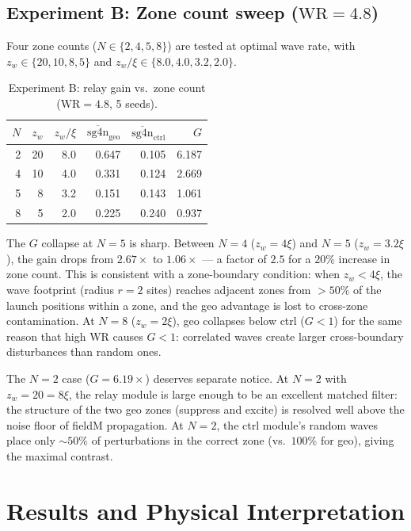 \documentclass[11pt]{article}
\begin{document}
\subsection*{Experiment B: Zone count sweep ($\mathrm{WR} = 4.8$)}

Four zone counts ($N \in \{2, 4, 5, 8\}$) are tested at optimal wave rate,
with $z_w \in \{20, 10, 8, 5\}$ and $z_w/\xi \in \{8.0, 4.0, 3.2, 2.0\}$.

\begin{table}[h]
\centering
\caption{Experiment B: relay gain vs.\ zone count ($\mathrm{WR}=4.8$, 5 seeds).}
\label{tab:exp_b}
\begin{tabular}{rrrrrr}
\toprule
$N$ & $z_w$ & $z_w/\xi$ & $\overline{\mathrm{sg4n}}_{\mathrm{geo}}$ & $\overline{\mathrm{sg4n}}_{\mathrm{ctrl}}$ & $G$ \\
\midrule
2 & 20 & 8.0 & 0.647 & 0.105 & 6.187 \\
4 & 10 & 4.0 & 0.331 & 0.124 & 2.669 \\
5 &  8 & 3.2 & 0.151 & 0.143 & 1.061 \\
8 &  5 & 2.0 & 0.225 & 0.240 & 0.937 \\
\bottomrule
\end{tabular}
\end{table}

The $G$ collapse at $N = 5$ is sharp. Between $N = 4$ ($z_w = 4\xi$) and $N = 5$
($z_w = 3.2\xi$), the gain drops from $2.67\times$ to $1.06\times$ --- a factor of $2.5$
for a $20\%$ increase in zone count. This is consistent with a zone-boundary condition:
when $z_w < 4\xi$, the wave footprint (radius $r = 2$ sites) reaches adjacent zones
from $> 50\%$ of the launch positions within a zone, and the geo advantage is lost to
cross-zone contamination. At $N = 8$ ($z_w = 2\xi$), geo collapses below ctrl ($G < 1$)
for the same reason that high WR causes $G < 1$: correlated waves create larger
cross-boundary disturbances than random ones.

The $N = 2$ case ($G = 6.19\times$) deserves separate notice. At $N = 2$ with
$z_w = 20 = 8\xi$, the relay module is large enough to be an excellent matched filter:
the structure of the two geo zones (suppress and excite) is resolved well above the noise
floor of fieldM propagation. At $N = 2$, the ctrl module's random waves place only $\sim
50\%$ of perturbations in the correct zone (vs.\ $100\%$ for geo), giving the maximal
contrast.

\section{Results and Physical Interpretation}
\end{document}
